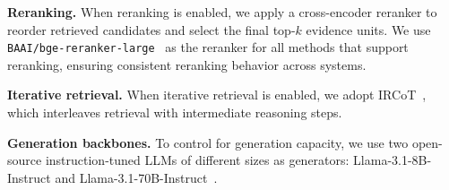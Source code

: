 \noindent \textbf{Reranking.}
When reranking is enabled, we apply a cross-encoder reranker to reorder retrieved candidates and select the final top-$k$ evidence units. 
We use \texttt{BAAI/bge-reranker-large}~\cite{bge_embedding} as the reranker for all methods that support reranking, ensuring consistent reranking behavior across systems.

\noindent \textbf{Iterative retrieval.}
When iterative retrieval is enabled, we adopt IRCoT~\cite{trivedi2022interleaving}, which interleaves retrieval with intermediate reasoning steps. 

\noindent \textbf{Generation backbones.}
To control for generation capacity, we use two open-source instruction-tuned LLMs of different sizes as generators: Llama-3.1-8B-Instruct and Llama-3.1-70B-Instruct~\cite{dubey2024llama}. 
